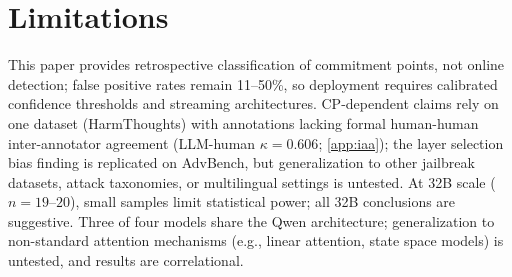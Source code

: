\section*{Limitations}\label{sec:limitations}

This paper provides retrospective classification of commitment points, not online detection; false positive rates remain 11--50\%, so deployment requires calibrated confidence thresholds and streaming architectures. CP-dependent claims rely on one dataset (HarmThoughts) with annotations lacking formal human-human inter-annotator agreement (LLM-human $\kappa{=}0.606$; \cref{app:iaa}); the layer selection bias finding is replicated on AdvBench, but generalization to other jailbreak datasets, attack taxonomies, or multilingual settings is untested. At 32B scale ($n{=}19$--$20$), small samples limit statistical power; all 32B conclusions are suggestive. Three of four models share the Qwen architecture; generalization to non-standard attention mechanisms (e.g., linear attention, state space models) is untested, and results are correlational.
